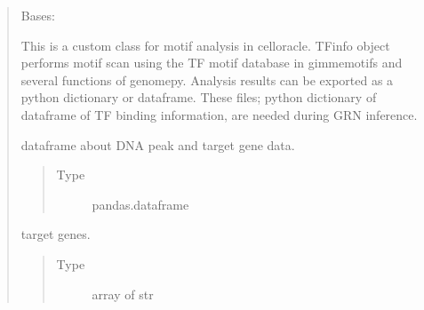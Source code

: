 \documentclass[letterpaper,10pt,english]{sphinxmanual}
\begin{document}
\begin{quote}
\begin{fulllineitems}
\end{fulllineitems}


\begin{fulllineitems}
\label{\detokenize{modules/celloracle.motif_analysis:celloracle.motif_analysis.TFinfo}}
Bases: 

This is a custom class for motif analysis in celloracle.
TFinfo object performs motif scan using the TF motif database in gimmemotifs and several functions of genomepy.
Analysis results can be exported as a python dictionary or dataframe.
These files; python dictionary of dataframe of TF binding information, are needed during GRN inference.

\begin{fulllineitems}
\label{\detokenize{modules/celloracle.motif_analysis:celloracle.motif_analysis.TFinfo.peak_df}}
dataframe about DNA peak and target gene data.
\begin{quote}\begin{description}
\item[{Type}] \leavevmode
pandas.dataframe

\end{description}\end{quote}

\end{fulllineitems}


\begin{fulllineitems}
\label{\detokenize{modules/celloracle.motif_analysis:celloracle.motif_analysis.TFinfo.all_target_gene}}
target genes.
\begin{quote}\begin{description}
\item[{Type}] \leavevmode
array of str


\end{description}
\end{quote}
\end{fulllineitems}
\end{fulllineitems}
\end{quote}
\end{document}

